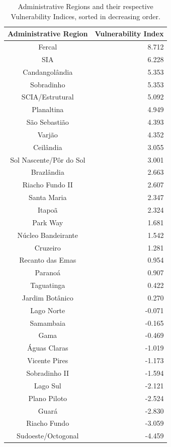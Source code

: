 \documentclass[conference]{IEEEtran}
\begin{document}
\begin{table}[H]
\centering
\begin{tabular}{|c|r|}
\hline
\textbf{Administrative Region} & \textbf{Vulnerability Index} \\
\hline
Fercal & 8.712 \\
\hline
SIA & 6.228 \\
\hline
Candangolândia & 5.353 \\
\hline
Sobradinho & 5.353 \\
\hline
SCIA/Estrutural & 5.092 \\
\hline
Planaltina & 4.949 \\
\hline
São Sebastião & 4.393 \\
\hline
Varjão & 4.352 \\
\hline
Ceilândia & 3.055 \\
\hline
Sol Nascente/Pôr do Sol & 3.001 \\
\hline
Brazlândia & 2.663 \\
\hline
Riacho Fundo II & 2.607 \\
\hline
Santa Maria & 2.347 \\
\hline
Itapoã & 2.324 \\
\hline
Park Way & 1.681 \\
\hline
Núcleo Bandeirante & 1.542 \\
\hline
Cruzeiro & 1.281 \\
\hline
Recanto das Emas & 0.954 \\
\hline
Paranoá & 0.907 \\
\hline
Taguatinga & 0.422 \\
\hline
Jardim Botânico & 0.270 \\
\hline
Lago Norte & -0.071 \\
\hline
Samambaia & -0.165 \\
\hline
Gama & -0.469 \\
\hline
Águas Claras & -1.019 \\
\hline
Vicente Pires & -1.173 \\
\hline
Sobradinho II & -1.594 \\
\hline
Lago Sul & -2.121 \\
\hline
Plano Piloto & -2.524 \\
\hline
Guará & -2.830 \\
\hline
Riacho Fundo & -3.059 \\
\hline
Sudoeste/Octogonal & -4.459 \\
\hline
\end{tabular}
\caption{Administrative Regions and their respective Vulnerability Indices, sorted in decreasing order.}
\label{tab:vulnerabilidade}
\end{table}
\end{document}
